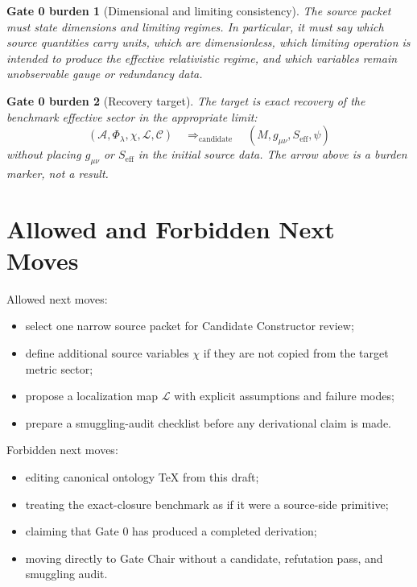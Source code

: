 \documentclass[11pt]{article}
\newcommand{\Sub}{\mathcal{A}}
\newtheorem{burden}{Gate 0 burden}
\begin{document}
\begin{burden}[Dimensional and limiting consistency]
The source packet must state dimensions and limiting regimes. In particular,
it must say which source quantities carry units, which are dimensionless,
which limiting operation is intended to produce the effective relativistic
regime, and which variables remain unobservable gauge or redundancy data.
\end{burden}

\begin{burden}[Recovery target]
The target is exact recovery of the benchmark effective sector in the
appropriate limit:
\[
(\Sub,\Phi_{\lambda},\chi,\mathcal{L},\mathcal{C})
\quad\Longrightarrow_{\mathrm{candidate}}\quad
(M,g_{\mu\nu},S_{\mathrm{eff}},\psi)
\]
without placing \(g_{\mu\nu}\) or \(S_{\mathrm{eff}}\) in the initial source
data. The arrow above is a burden marker, not a result.
\end{burden}

\section{Allowed and Forbidden Next Moves}

Allowed next moves:
\begin{itemize}
    \item select one narrow source packet for Candidate Constructor review;
    \item define additional source variables \(\chi\) if they are not copied
    from the target metric sector;
    \item propose a localization map \(\mathcal{L}\) with explicit
    assumptions and failure modes;
    \item prepare a smuggling-audit checklist before any derivational claim is
    made.
\end{itemize}

Forbidden next moves:
\begin{itemize}
    \item editing canonical ontology TeX from this draft;
    \item treating the exact-closure benchmark as if it were a source-side
    primitive;
    \item claiming that Gate 0 has produced a completed derivation;
    \item moving directly to Gate Chair without a candidate, refutation pass,
    and smuggling audit.
\end{itemize}
\end{document}
